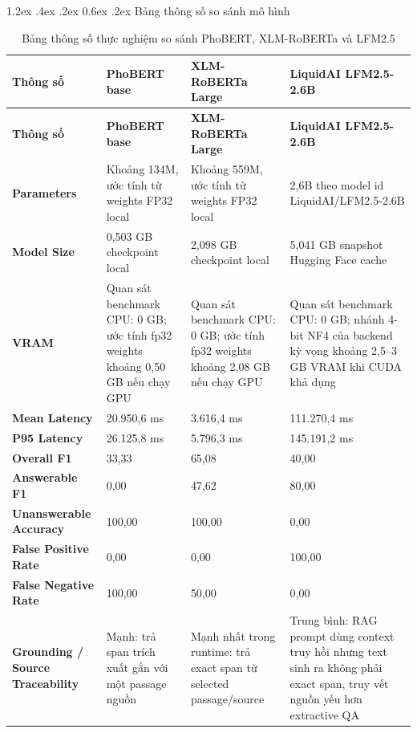 \documentclass[12pt,a4paper,oneside]{report}
\makeatletter
\renewcommand\section{\@startsection {section}{1}{\z@}%
  {1.2ex \@plus .4ex \@minus .2ex}%
  {0.6ex \@plus .2ex}%
  {\normalfont\Large\bfseries}}
\makeatother
\begin{document}
\section{Bảng thông số so sánh mô hình}
\begingroup
\footnotesize
\setlength{\tabcolsep}{4pt}
\begin{longtable}{L{3.25cm}L{3.75cm}L{3.75cm}L{3.75cm}}
\caption{Bảng thông số thực nghiệm so sánh PhoBERT, XLM-RoBERTa và LFM2.5}
\label{tab:model-spec-comparison}\\
\toprule
\textbf{Thông số} & \textbf{PhoBERT base} & \textbf{XLM-RoBERTa Large} & \textbf{LiquidAI LFM2.5-2.6B} \\
\midrule
\endfirsthead
\toprule
\textbf{Thông số} & \textbf{PhoBERT base} & \textbf{XLM-RoBERTa Large} & \textbf{LiquidAI LFM2.5-2.6B} \\
\midrule
\endhead
\textbf{Parameters} & Khoảng 134M, ước tính từ weights FP32 local & Khoảng 559M, ước tính từ weights FP32 local & 2,6B theo model id LiquidAI/LFM2.5-2.6B \\
\textbf{Model Size} & 0,503 GB checkpoint local & 2,098 GB checkpoint local & 5,041 GB snapshot Hugging Face cache \\
\textbf{VRAM} & Quan sát benchmark CPU: 0 GB; ước tính fp32 weights khoảng 0,50 GB nếu chạy GPU & Quan sát benchmark CPU: 0 GB; ước tính fp32 weights khoảng 2,08 GB nếu chạy GPU & Quan sát benchmark CPU: 0 GB; nhánh 4-bit NF4 của backend kỳ vọng khoảng 2,5--3 GB VRAM khi CUDA khả dụng \\
\textbf{Mean Latency} & 20.950,6 ms & 3.616,4 ms & 111.270,4 ms \\
\textbf{P95 Latency} & 26.125,8 ms & 5.796,3 ms & 145.191,2 ms \\
\textbf{Overall F1} & 33,33 & 65,08 & 40,00 \\
\textbf{Answerable F1} & 0,00 & 47,62 & 80,00 \\
\textbf{Unanswerable Accuracy} & 100,00 & 100,00 & 0,00 \\
\textbf{False Positive Rate} & 0,00 & 0,00 & 100,00 \\
\textbf{False Negative Rate} & 100,00 & 50,00 & 0,00 \\
\textbf{Grounding / Source Traceability} & Mạnh: trả span trích xuất gắn với một passage nguồn & Mạnh nhất trong runtime: trả exact span từ selected passage/source & Trung bình: RAG prompt dùng context truy hồi nhưng text sinh ra không phải exact span, truy vết nguồn yếu hơn extractive QA \\
\bottomrule
\end{longtable}
\endgroup
\end{document}
